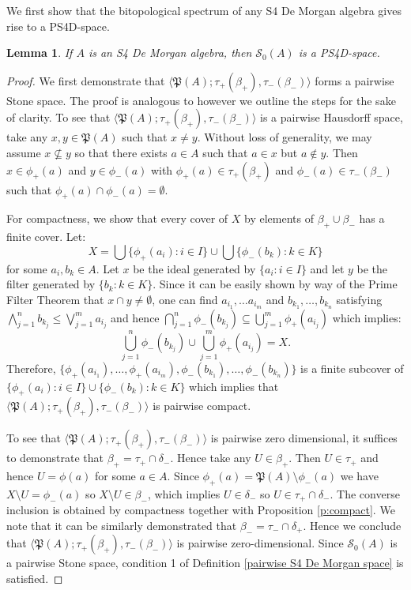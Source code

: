 \documentclass{amsart}
\theoremstyle{plain}
\newtheorem{lemma}[theorem]{Lemma}
\theoremstyle{definition}
\begin{document}
We first show that the bitopological spectrum of any S4 De Morgan algebra gives rise to a PS4D-space. 
\begin{lemma}\label{algebra to space}
    If $A$ is an S4 De Morgan algebra, then $\mathcal{S}_0(A)$ is a PS4D-space. 
\end{lemma}
\begin{proof}
   We first demonstrate that $\langle\mathfrak{P}(A);\tau_+(\beta_+),\tau_-(\beta_-)\rangle$ forms a pairwise Stone space. The proof is analogous to \cite[Proposition 5.1]{bezhanishvili} however we outline the steps for the sake of clarity. To see that $\langle\mathfrak{P}(A);\tau_+(\beta_+),\tau_-(\beta_-)\rangle$ is a pairwise Hausdorff space, take any $x,y\in\mathfrak{P}(A)$ such that $x\not=y$. Without loss of generality, we may assume $x\not\subseteq y$ so that there exists $a\in A$ such that $a\in x$ but $a\not\in y$. Then $x\in\phi_+(a)$ and $y\in\phi_-(a)$ with $\phi_+(a)\in\tau_+(\beta_+)$ and $\phi_-(a)\in\tau_-(\beta_-)$ such that $\phi_+(a)\cap\phi_-(a)=\emptyset$.
   
   
   For compactness, we show that every cover of $X$ by elements of $\beta_+\cup\beta_-$ has a finite cover. Let: \[X=\bigcup\{\phi_+(a_i):i\in I\}\cup\bigcup\{\phi_-(b_k):k\in K\}\] for some $a_i,b_k\in A$. Let $x$ be the ideal generated by $\{a_i:i\in I\}$ and let $y$ be the filter generated by $\{b_k:k\in K\}$. Since it can be easily shown by way of the Prime Filter Theorem that $x\cap y\not=\emptyset$, one can find $a_{i_1},\dots a_{i_m}$ and $b_{k_1}, \dots, b_{k_n}$ satisfying $\bigwedge^n_{j=1} b_{k_j}\leq\bigvee^m_{j=1} a_{i_j}$ and hence $\bigcap^n_{j=1} \phi_-(b_{k_j})\subseteq\bigcup^m_{j=1} \phi_+(a_{i_j})$ which implies:
   \[\bigcup^n_{j=1} \phi_-(b_{k_j})\cup\bigcup^m_{j=1} \phi_+(a_{i_j})=X.\] Therefore, $\{\phi_+(a_{i_1}), \dots,\phi_+(a_{i_m}), \phi_-(b_{k_1}),\dots,\phi_-(b_{k_n})\}$ is a finite subcover of $\{\phi_+(a_i):i\in I\}\cup\{\phi_-(b_k):k\in K\}$ which implies that $\langle\mathfrak{P}(A);\tau_+(\beta_+),\tau_-(\beta_-)\rangle$ is pairwise compact.

   To see that $\langle\mathfrak{P}(A);\tau_+(\beta_+),\tau_-(\beta_-)\rangle$ is pairwise zero dimensional, it suffices to demonstrate that $\beta_+=\tau_+\cap\delta_-$. Hence take any $U\in\beta_+$. Then $U\in\tau_+$ and hence $U=\phi(a)$ for some $a\in A$. Since $\phi_+(a)=\mathfrak{P}(A)\setminus\phi_-(a)$ we have $X\setminus U=\phi_-(a)$ so $X\setminus U\in\beta_-$, which implies $U\in\delta_-$ so $U\in\tau_+\cap\delta_-$. The converse inclusion is obtained by compactness together with Proposition \ref{p:compact}. We note that it can be similarly demonstrated that $\beta_-=\tau_-\cap\delta_+$. Hence we conclude that $\langle\mathfrak{P}(A);\tau_+(\beta_+),\tau_-(\beta_-)\rangle$ is pairwise zero-dimensional. Since $\mathcal{S}_0(A)$ is a pairwise Stone space, condition 1 of Definition \ref{pairwise S4 De Morgan space} is satisfied.      



\end{proof}
\end{document}
